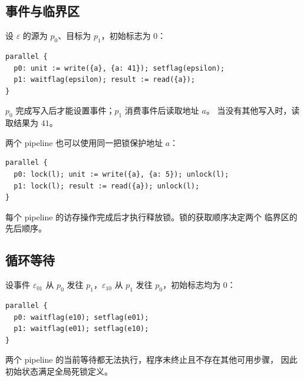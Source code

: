 \documentclass[UTF8,a4paper,11pt,fontset=fandol]{ctexart}
\begin{document}
\subsection{事件与临界区}

设 $\varepsilon$ 的源为 $p_0$、目标为 $p_1$，初始标志为 $0$：
\begin{lstlisting}
parallel {
  p0: unit := write({a}, {a: 41}); setflag(epsilon);
  p1: waitflag(epsilon); result := read({a});
}
\end{lstlisting}
$p_0$ 完成写入后才能设置事件；$p_1$ 消费事件后读取地址 $a$。
当没有其他写入时，读取结果为 $41$。

两个 pipeline 也可以使用同一把锁保护地址 $a$：
\begin{lstlisting}
parallel {
  p0: lock(l); unit := write({a}, {a: 5}); unlock(l);
  p1: lock(l); result := read({a}); unlock(l);
}
\end{lstlisting}
每个 pipeline 的访存操作完成后才执行释放锁。锁的获取顺序决定两个
临界区的先后顺序。

\subsection{循环等待}

设事件 $\varepsilon_{01}$ 从 $p_0$ 发往 $p_1$，$\varepsilon_{10}$
从 $p_1$ 发往 $p_0$，初始标志均为 $0$：
\begin{lstlisting}
parallel {
  p0: waitflag(e10); setflag(e01);
  p1: waitflag(e01); setflag(e10);
}
\end{lstlisting}
两个 pipeline 的当前等待都无法执行，程序未终止且不存在其他可用步骤，
因此初始状态满足全局死锁定义。
\end{document}

